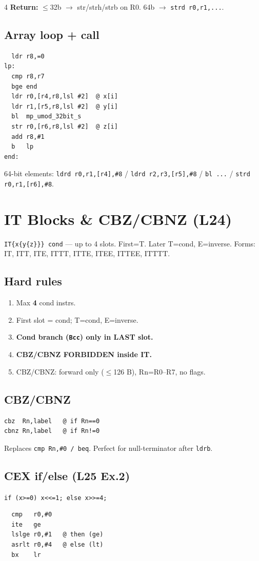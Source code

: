 \documentclass[8pt,landscape]{extarticle}
\newcommand{\asm}[1]{\texttt{\scriptsize #1}}
\newcommand{\cee}[1]{\texttt{\scriptsize #1}}
\begin{document}
\begin{multicols*}{4}
\textbf{Return:} $\le$32b $\to$ str/strh/strb on R0. 64b $\to$ \asm{strd r0,r1,...}.

\subsection{Array loop + call}
\begin{lstlisting}
  ldr r8,=0
lp:
  cmp r8,r7
  bge end
  ldr r0,[r4,r8,lsl #2]  @ x[i]
  ldr r1,[r5,r8,lsl #2]  @ y[i]
  bl  mp_umod_32bit_s
  str r0,[r6,r8,lsl #2]  @ z[i]
  add r8,#1
  b   lp
end:
\end{lstlisting}
64-bit elements: \asm{ldrd r0,r1,[r4],\#8} / \asm{ldrd r2,r3,[r5],\#8} / \asm{bl ...} / \asm{strd r0,r1,[r6],\#8}.

\section{IT Blocks \& CBZ/CBNZ (L24)}

\asm{IT\{x\{y\{z\}\}\} cond} --- up to 4 slots. First=T. Later T=cond, E=inverse. Forms: IT, ITT, ITE, ITTT, ITTE, ITEE, ITTEE, ITTTT.

\subsection{Hard rules}
\begin{enumerate}
\item Max \textbf{4} cond instrs.
\item First slot = cond; T=cond, E=inverse.
\item \textbf{Cond branch (\asm{Bcc}) only in LAST slot.}
\item \textbf{CBZ/CBNZ FORBIDDEN inside IT.}
\item CBZ/CBNZ: forward only ($\le$126 B), Rn=R0--R7, no flags.
\end{enumerate}

\subsection{CBZ/CBNZ}
\begin{lstlisting}
cbz  Rn,label   @ if Rn==0
cbnz Rn,label   @ if Rn!=0
\end{lstlisting}
Replaces \asm{cmp Rn,\#0 / beq}. Perfect for null-terminator after \asm{ldrb}.

\subsection{CEX if/else (L25 Ex.2)}
\cee{if (x>=0) x<<=1; else x>>=4;}
\begin{lstlisting}
  cmp   r0,#0
  ite   ge
  lslge r0,#1   @ then (ge)
  asrlt r0,#4   @ else (lt)
  bx    lr
\end{lstlisting}


\end{multicols*}
\end{document}
